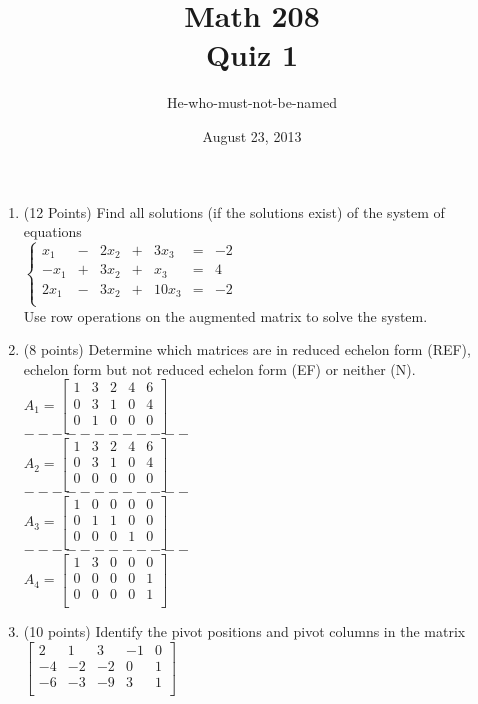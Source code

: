 \documentclass[12pt]{article}
\title{Math 208\\Quiz 1}
\date{August 23, 2013}
\author{He-who-must-not-be-named}
\begin{document}
\maketitle
\begin{enumerate}
	\item (12 Points) Find all solutions (if the solutions exist) of the system of equations \\
	  $\left\{
	  \begin{array}{ccccccc}
	    x_1 & - & 2x_2 & + & 3x_3 & = & -2\\
	    -x_1 & + & 3x_2 & + & x_3 & = & 4\\
	    2x_1 & - & 3x_2 & + & 10x_3 & = & -2\\
	  \end{array}\right.$\\
	  Use row operations on the augmented matrix to solve the system.
	\item (8 points) Determine which matrices are in reduced echelon form (REF), 
				    echelon form but not reduced echelon form (EF) or neither (N).\\ 

		$A_1 = \left[\begin{array}{ccccc}
		  1&3&2&4&6\\
		  0&3&1&0&4\\
		  0&1&0&0&0\\
		\end{array}\right]$\\
		$------------$\\
		$A_2 = \left[\begin{array}{ccccc}
		  1&3&2&4&6\\
		  0&3&1&0&4\\
		  0&0&0&0&0\\
		\end{array}\right]$\\
		$------------$\\
		$A_3 = \left[\begin{array}{ccccc}
		  1&0&0&0&0\\
		  0&1&1&0&0\\
		  0&0&0&1&0\\
		\end{array}\right]$\\
		$------------$\\
		$A_4 = \left[\begin{array}{ccccc}
		  1&3&0&0&0\\
		  0&0&0&0&1\\
		  0&0&0&0&1\\
		\end{array}\right]$\\
	\item (10 points) Identify the pivot positions and pivot columns in the matrix \\
		$\left[\begin{array}{rrrrr}
		   2&1&3&-1&0\\
		  -4&-2&-2&0&1\\
		  -6&-3&-9&3&1\\
		\end{array}\right]$
\end{enumerate}
\end{document}
